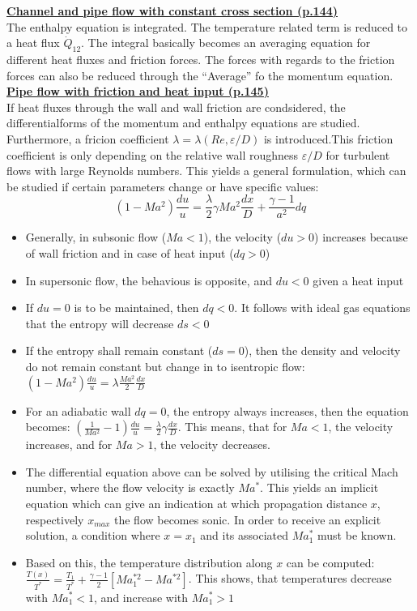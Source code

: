 \documentclass[8pt, landscape, fleqn]{scrartcl}
\begin{document}
\begin{multicols*}{3}
\underline{\textbf{Channel and pipe flow with constant cross section (p.144)}}\\
The enthalpy equation is integrated. The temperature related term is reduced to a heat flux $\dot{Q}_{12}$. The integral basically becomes an averaging equation for different heat fluxes and friction forces. The forces with regards to the friction forces can also be reduced through the ``Average'' fo the momentum equation. \\

\underline{\textbf{Pipe flow with friction and heat input (p.145)}} \\
If heat fluxes through the wall and wall friction are condsidered, the differentialforms of the momentum and enthalpy equations are studied. Furthermore, a fricion coefficient $\lambda = \lambda(Re, \varepsilon/D)$ is introduced.This friction coefficient is only depending on the relative wall roughness $\varepsilon/D$ for turbulent flows with large Reynolds numbers. This yields a general formulation, which can be studied if certain parameters change or have specific values:
\begin{equation*}
    (1-Ma^2)\frac{du}{u} = \frac{\lambda}{2}\gamma Ma^2 \frac{dx}{D} + \frac{\gamma-1}{a^2} dq
\end{equation*}
\begin{itemize}
    \item Generally, in subsonic flow ($Ma < 1$), the velocity ($du > 0$) increases because of wall friction and in case of heat input ($dq > 0$) 
    \item In supersonic flow, the behavious is opposite, and $du < 0$ given a heat input
    \item If $du = 0$ is to be maintained, then $dq < 0$. It follows with ideal gas equations that the entropy will decrease $ds < 0$
    \item If the entropy shall remain constant ($ds = 0$), then the density and velocity do not remain constant but change in to isentropic flow: $(1-Ma^2)\frac{du}{u}=\lambda \frac{Ma^2}{2}\frac{dx}{D}$ 
    \item For an adiabatic wall $dq=0$, the entropy always increases, then the equation becomes: $\left( \frac{1}{Ma^2}-1 \right)\frac{du}{u} = \frac{\lambda}{2}\gamma \frac{dx}{D}$. This means, that for $Ma <1$, the velocity increases, and for $Ma > 1$, the velocity decreases. 
    \item The differential equation above can be solved by utilising the critical Mach number, where the flow velocity is exactly $Ma^*$. This yields an implicit equation which can give an indication at which propagation distance $x$, respectively $x_{max}$ the flow becomes sonic. In order to receive an explicit solution, a condition where $x=x_1$ and its associated $Ma_1^*$ must be known.
    \item Based on this, the temperature distribution along $x$ can be computed: $\frac{T(x)}{T^*} = \frac{T_1}{T^*} + \frac{\gamma-1}{2}\left[Ma_1^{*2}-Ma^{*2}\right]$. This shows, that temperatures decrease with $Ma_1^* < 1$, and increase with $Ma_1^* > 1$
\end{itemize}


\end{multicols*}
\end{document}

